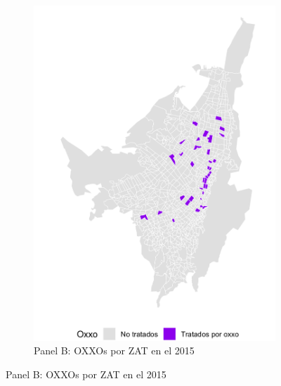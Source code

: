 \documentclass{article}
\begin{document}
\begin{figure}
\begin{subfigure}[b]{0.4\textwidth}
        \includegraphics[width=\linewidth]{figs_oxxo_maps/mapa_oxxos_binary_2015.png}
        \caption{Panel B: OXXOs por ZAT en el 2015}
        \label{fig:panelB}
    \end{subfigure}
    
    \vspace{0.5cm}
    

\end{figure}
\end{document}
